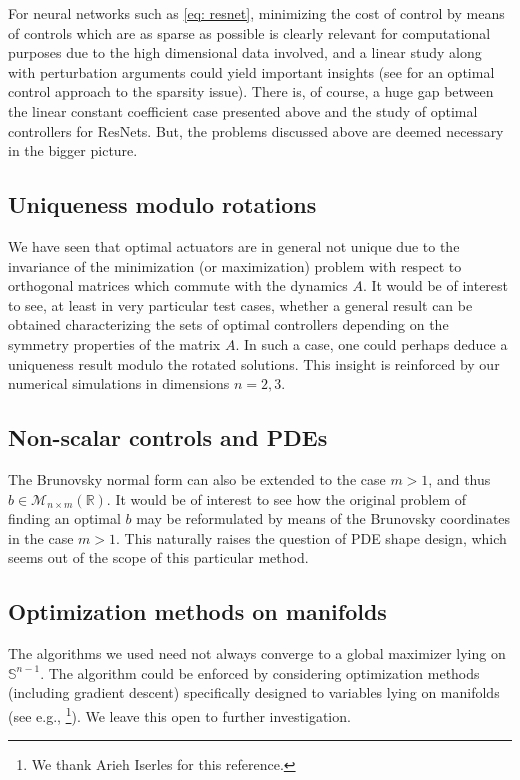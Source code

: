 \documentclass[11pt, a4paper, reqno]{amsart}
\newcommand{\R}{\mathbb{R}}
\theoremstyle{plain}
\numberwithin{equation}{section}
\begin{document}
	For neural networks such as \eqref{eq: resnet}, minimizing the cost of control by means of controls which are as sparse as possible is clearly relevant for computational purposes due to the high dimensional data involved, and a linear study along with perturbation arguments could yield important insights (see \citep{yague2021sparse} for an optimal control approach to the sparsity issue). 
	There is, of course, a huge gap between the linear constant coefficient case presented above and the study of optimal controllers for ResNets. 
	But, the problems discussed above are deemed necessary in the bigger picture.
	
	\subsection{Uniqueness modulo rotations} We have seen that optimal actuators are in general not unique due to the invariance of the minimization (or maximization) problem with respect to orthogonal matrices which commute with the dynamics $A$. It would be of interest to see, at least in very particular test cases, whether a general result can be obtained characterizing the sets of optimal controllers depending on the symmetry properties of the matrix $A$. In such a case, one could perhaps deduce a uniqueness result modulo the rotated solutions. This insight is reinforced by our numerical simulations in dimensions $n=2,3$.
		
	\subsection{Non-scalar controls and PDEs} The Brunovsky normal form can also be extended to the case $m>1$, and thus $b \in \mathcal{M}_{n\times m}(\R)$. It would be of interest to see how the original problem of finding an optimal $b$  may be reformulated by means of the Brunovsky coordinates in the case $m>1$. This naturally raises the question of PDE shape design, which seems out of the scope of this particular method.
	
	\subsection{Optimization methods on manifolds}
	
	The algorithms we used need not always converge to a global maximizer lying on $\mathbb{S}^{n-1}$. The algorithm could be enforced by considering optimization methods (including gradient descent) specifically designed to variables lying on manifolds (see e.g., \citep{boumal2020introduction}\footnote{We thank Arieh Iserles for this reference.}). We leave this open to further investigation. 
	\medskip
	
\end{document}
